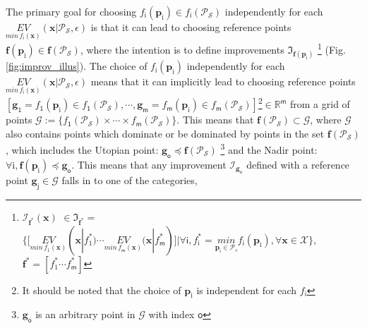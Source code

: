  The primary goal for choosing $f_{\mathsf{i}}(\bm{p}_{\mathrm i}) \in f_{\mathsf{i}}(\mathscr{P}_{\mathcal{S}})$ independently for each $\underset{min\,f_{\mathsf{i}}(\bm{x})}{EV}(\bm{x}|\mathscr{P}_{\mathcal{S}},\epsilon)$ is that it can lead to choosing reference points $\bm f(\bm{p}_{\mathrm i}) \in \bm f(\mathscr{P}_{\mathcal{S}})$, where the intention is to define improvements $\mathfrak{I}_{\bm f(\bm{p}_{\mathrm i})}$ 
  \footnote{$\mathscr{I}_{\bm{f}^*} (\bm x)$ $\in \mathfrak{I}_{\bm{f}^*}=$$\Big\{\Big[\underset{min\,f_1(\bm{x})}{EV}(\bm x|f^*_1) \cdots \underset{min\,f_{\mathsf{m}}(\bm{x})}{EV}(\bm x|f^*_{\mathsf{m}})\Big]| \forall \mathsf{i},f_{\mathsf{i}}^{*} = \underset{\bm{p}_{\mathrm i}\in \mathscr{P}_s}{min} f_{\mathsf{i}}(\bm{p}_{\mathrm i}), \forall \bm x \in \mathcal{X}\Big\}$, ${\bm{f}^* =[f^*_1 \cdots f^*_{\mathsf{m}}]}$} (Fig. \ref{fig:improv_illus}). %
 The choice of $f_{\mathsf{i}}(\bm{p}_{\mathrm i})$ independently for each $\underset{min\,f_{\mathsf{i}}(\bm{x})}{EV}(\bm{x}|\mathscr{P}_{\mathcal{S}},\epsilon)$ means that it can implicitly lead to choosing reference points $[\bm g_{\mathsf 1}= f_{\mathsf{1}}(\bm{p}_{\mathrm i}) \in f_{\mathsf{1}}(\mathscr{P}_{\mathcal{S}}), \cdots, \bm g_{\mathsf m}= f_{\mathsf{m}}(\bm{p}_{\mathrm i}) \in f_{\mathsf{m}}(\mathscr{P}_{\mathcal{S}}) ]$\footnote{It should be noted that the choice of $\bm{p}_{\mathrm i}$ is independent for each $f_{\mathsf{i}}$}$\in \mathbb{R}^{\mathsf{m}}$ from a grid of points $\mathscr{G}:=\{f_{\mathsf{1}}(\mathscr{P}_{\mathcal{S}}) \times \cdots  \times f_{\mathsf{m}}(\mathscr{P}_{\mathcal{S}})\}$. 
This means that $\bm f(\mathscr{P}_{\mathcal{S}})\subset\mathscr{G}$, where $\mathscr{G}$ also contains points which dominate or be dominated by points in the set $\bm f(\mathscr{P}_{\mathcal{S}})$, which includes the Utopian point: $\bm g_{\mathsf{o}} \preceq \bm f(\mathscr{P}_{\mathcal{S}})$ \footnote{$\bm g_{\mathsf o} $ is an arbitrary point in $\mathscr{G}$ with index $\mathsf{o}$} and the Nadir point: $\forall {\mathrm{i}}, \bm f(\bm p_{\mathrm{i}})  \preceq {\bm g_{\mathsf{o}}}$.  
  \iffalse
  This means that any improvement $ \mathscr{I}_{\bm {g}_{\mathsf o}}$ defined with a reference point $\bm {g}_{\mathsf j} \in \mathscr{G}$ falls in to one of the categories, 
  
